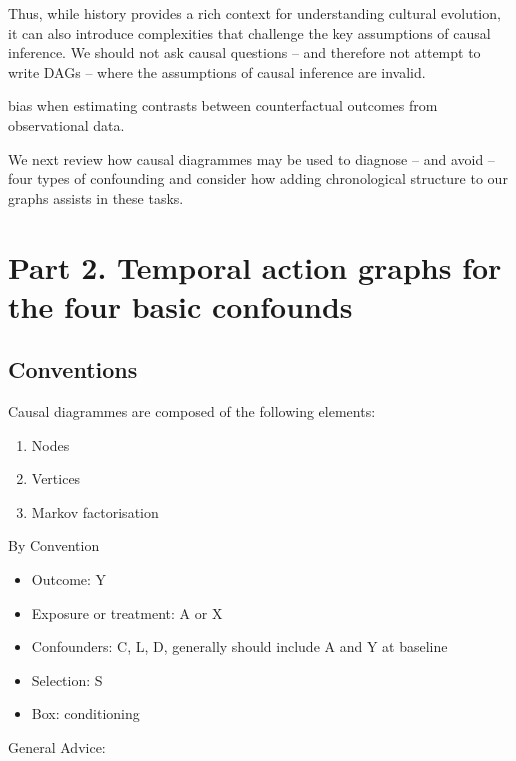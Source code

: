 \documentclass[
  singlecolumn]{report}
\providecommand{\tightlist}{%
  \setlength{\itemsep}{0pt}\setlength{\parskip}{0pt}}\usepackage{longtable,booktabs,array}
\begin{document}
Thus, while history provides a rich context for understanding cultural
evolution, it can also introduce complexities that challenge the key
assumptions of causal inference. We should not ask causal questions --
and therefore not attempt to write DAGs -- where the assumptions of
causal inference are invalid.

bias when estimating contrasts between counterfactual outcomes from
observational data.

We next review how causal diagrammes may be used to diagnose -- and
avoid -- four types of confounding and consider how adding chronological
structure to our graphs assists in these tasks.

\hypertarget{part-2.-temporal-action-graphs-for-the-four-basic-confounds}{%
\section{Part 2. Temporal action graphs for the four basic
confounds}\label{part-2.-temporal-action-graphs-for-the-four-basic-confounds}}

\hypertarget{conventions}{%
\subsection{Conventions}\label{conventions}}

Causal diagrammes are composed of the following elements:

\begin{enumerate}
\def\labelenumi{\arabic{enumi}.}
\tightlist
\item
  Nodes
\item
  Vertices
\item
  Markov factorisation
\end{enumerate}

By Convention

\begin{itemize}
\tightlist
\item
  Outcome: Y
\item
  Exposure or treatment: A or X
\item
  Confounders: C, L, D, generally should include A and Y at baseline
\item
  Selection: S
\item
  Box: conditioning
\end{itemize}

General Advice:
\end{document}
